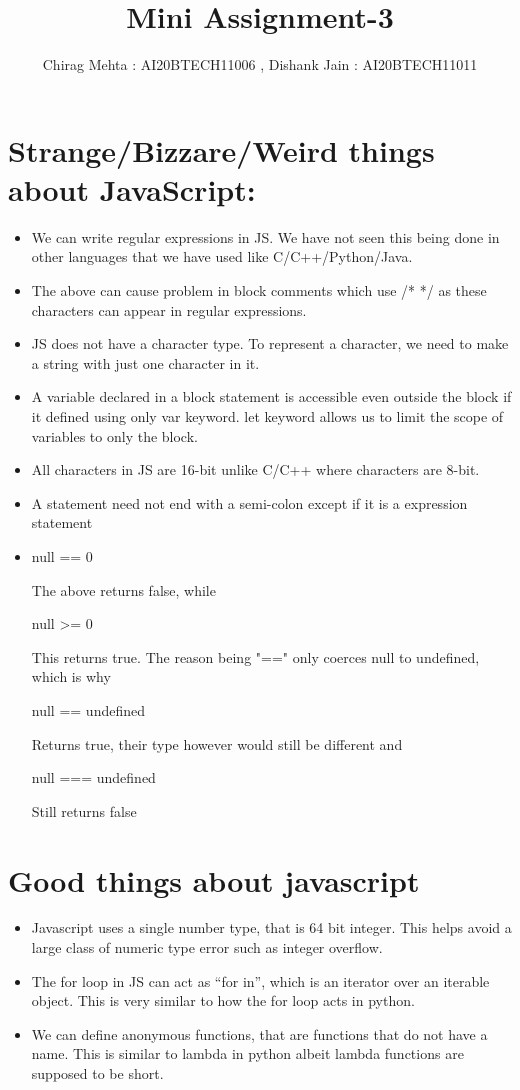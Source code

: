 \documentclass[11pt,a4paper]{article}
\begin{document}
\title{Mini Assignment-3}
\author{Chirag Mehta : AI20BTECH11006 , Dishank Jain : AI20BTECH11011}

\maketitle

\section{Strange/Bizzare/Weird things about JavaScript:}
\begin{itemize}
    \item We can write regular expressions in JS. We have not seen this being done in other languages that we have used like C/C++/Python/Java.
    \item The above can cause problem in block comments which use /* */ as these characters can appear in regular expressions.
    \item JS does not have a character type. To represent a character, we need to make a string with just one character in it.
    \item A variable declared in a block statement is accessible even outside the block if it defined using only var keyword. let keyword allows us  to limit the scope of variables to only the block.
    \item All characters in JS are 16-bit unlike C/C++ where characters are 8-bit.
    \item A statement need not end with a semi-colon except if it is a expression statement
    \item null == 0
        
        The above returns false, while

        null >= 0

        This returns true. The reason being "==" only coerces null to undefined, which is why

        null == undefined

        Returns true, their type however would still be different and

        null === undefined 

        Still returns false
    
\end{itemize}

\section{Good things about javascript}
\begin{itemize}
    \item Javascript uses a single number type, that is 64 bit integer. This helps avoid a large class of numeric type error such as integer overflow.
    \item The for loop in JS can act as “for in”, which is an iterator over an iterable object. This is very similar to how the for loop acts in python.
    \item We can define anonymous functions, that are functions that do not have a name. This is similar to lambda in python albeit lambda functions are supposed to be short.
\end{itemize}
\end{document}
